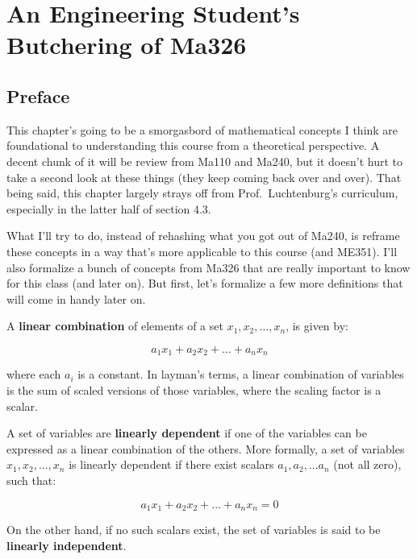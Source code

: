 \documentclass[
  letterpaper,
  DIV=11,
  numbers=noendperiod]{scrreprt}
\begin{document}

\hypertarget{an-engineering-students-butchering-of-ma326}{%
\chapter{An Engineering Student's Butchering of
Ma326}\label{an-engineering-students-butchering-of-ma326}}

\hypertarget{preface-2}{%
\section*{Preface}\label{preface-2}}


This chapter's going to be a smorgasbord of mathematical concepts I
think are foundational to understanding this course from a theoretical
perspective. A decent chunk of it will be review from Ma110 and Ma240,
but it doesn't hurt to take a second look at these things (they keep
coming back over and over). That being said, this chapter largely strays
off from Prof.~Luchtenburg's curriculum, especially in the latter half
of section 4.3.

What I'll try to do, instead of rehashing what you got out of Ma240, is
reframe these concepts in a way that's more applicable to this course
(and ME351). I'll also formalize a bunch of concepts from Ma326 that are
really important to know for this class (and later on). But first, let's
formalize a few more definitions that will come in handy later on.

A \textbf{linear combination} of elements of a set
\(x_1, x_2, ..., x_n\), is given by:

\[a_1 x_1 + a_2 x_2 + ... + a_n x_n \]

where each \(a_i\) is a constant. In layman's terms, a linear
combination of variables is the sum of scaled versions of those
variables, where the scaling factor is a scalar.

A set of variables are \textbf{linearly dependent} if one of the
variables can be expressed as a linear combination of the others. More
formally, a set of variables \(x_1, x_2, ..., x_n\) is linearly
dependent if there exist scalars \(a_1, a_2, ... a_n\) (not all zero),
such that:

\[a_1 x_1 + a_2 x_2 + ... + a_n x_n = 0\]

On the other hand, if no such scalars exist, the set of variables is
said to be \textbf{linearly independent}.
\end{document}
